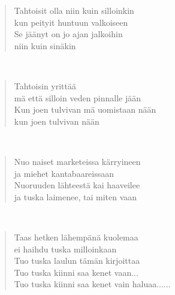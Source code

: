 \noindent\begin{minipage}{\linewidth}
\begin{verse}
	Tahtoisit olla niin kuin silloinkin\\
	kun peityit huntuun valkoiseen\\
	Se jäänyt on jo ajan jalkoihin\\
	niin kuin sinäkin\\
\end{verse}
\end{minipage}\\[10pt]
\noindent\begin{minipage}{\linewidth}
\begin{verse}
	Tahtoisin yrittää\\
	mä että silloin veden pinnalle jään\\
	Kun joen tulvivan mä uomistaan nään\\
	kun joen tulvivan nään\\
\end{verse}
\end{minipage}\\[10pt]
\noindent\begin{minipage}{\linewidth}
\begin{verse}
	Nuo naiset marketeissa kärryineen\\
	ja miehet kantabaareissaan\\
	Nuoruuden lähteestä kai haaveilee\\
	ja tuska laimenee, tai miten vaan\\
\end{verse}
\end{minipage}\\[10pt]
\noindent\begin{minipage}{\linewidth}
\begin{verse}
	Taas hetken lähempänä kuolemaa\\
	ei haihdu tuska milloinkaan\\
	Tuo tuska laulun tämän kirjoittaa\\
	Tuo tuska kiinni saa kenet vaan...\\
	Tuo tuska kiinni saa kenet vain haluaa......\\
\end{verse}
\end{minipage}\\[10pt]
%
%
